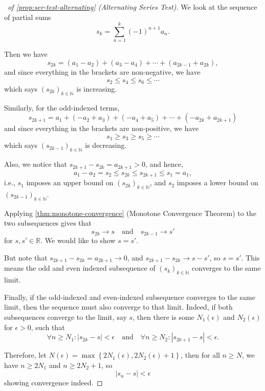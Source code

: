 \documentclass[11pt]{article}
\numberwithin{equation}{section}
\theoremstyle{definition}
\theoremstyle{remark}
\newcommand{\pqty}[1]{\left(#1\right)}
\newcommand{\Bqty}[1]{\left\{#1\right\}}
\newcommand{\abs}[1]{\left|#1\right|}
\newcommand{\RR}{\mathbb R}
\newcommand{\NN}{\mathbb N}
\newcommand{\qand}{\quad\text{and}\quad}
\begin{document}
\begin{proof}[\proofname\ of \autoref{prop:ser-test-alternating} (Alternating Series Test)]
    We look at the sequence of partial sums
    \[
        s_k = \sum_{n = 1}^{k} \pqty{-1}^{n + 1} a_n.
    \]
    
    Then we have
    \[
        s_{2k} = \pqty{a_1 - a_2} + \pqty{a_3 - a_4} + \cdots + \pqty{a_{2k - 1} + a_{2k}},
    \]
    and since everything in the brackets are non-negative, we have
    \[
        s_2 \leq s_4 \leq s_6 \leq \cdots
    \]
    which says \(\pqty{s_{2k}}_{k \in \NN}\) is increasing.

    Similarly, for the odd-indexed terms,
    \[
        s_{2k + 1} = a_1 + \pqty{- a_2 + a_3} + \pqty{- a_4 + a_5} + \cdots + \pqty{- a_{2k} + a_{2k + 1}}
    \]
    and since everything in the brackets are non-positive, we have
    \[
        s_1 \geq s_3 \geq s_5 \geq \cdots
    \]
    which says \(\pqty{s_{2k - 1}}_{k \in \NN}\) is decreasing.

    Also, we notice that \(s_{2k + 1} - s_{2k} = a_{2k + 1} > 0\), and hence,
    \[
        a_1 - a_2 = s_2 \leq s_{2k} \leq s_{2k + 1} \leq s_1 = a_1,
    \]
    i.e., \(s_1\) imposes an upper bound on \(\pqty{s_{2k}}_{k \in \NN}\), and \(s_2\) imposes a lower bound on \(\pqty{s_{2k - 1}}_{k \in \NN}\).
    
    Applying \autoref{thm:monotone-convergence} (Monotone Convergence Theorem) to the two subsequences gives that
    \[
        s_{2k} \to s \qand s_{2k - 1} \to s'
    \]
    for \(s, s' \in \RR\). We would like to show \(s = s'\).

    But note that \(s_{2k + 1} - s_{2k} = a_{2k + 1} \to 0\), and \(s_{2k + 1} - s_{2k} \to s - s'\), so \(s = s'\). This means the odd and even indexed subsequence of \(\pqty{s_k}_{k \in \NN}\) converges to the same limit.

    Finally, if the odd-indexed and even-indexed subsequence converges to the same limit, then the sequence must also converge to that limit. Indeed, if both subsequences converge to the limit, say \(s\), then there is some \(N_1\pqty{\epsilon}\) and \(N_2\pqty{\epsilon}\) for \(\epsilon > 0\), such that
    \[
        \forall n \geq N_1: \abs{s_{2k} - s} < \epsilon \qand \forall n \geq N_2: \abs{s_{2k + 1} - s} < \epsilon.
    \]

    Therefore, let \(N\pqty{\epsilon} = \max\Bqty{2 N_1\pqty{\epsilon}, 2 N_2 \pqty{\epsilon} + 1}\), then for all \(n \geq N\), we have \(n \geq 2 N_1\) and \(n \geq 2 N_2 + 1\), so
    \[
        \abs{s_n - s} < \epsilon
    \]
    showing convergence indeed.
\end{proof}
\end{document}
